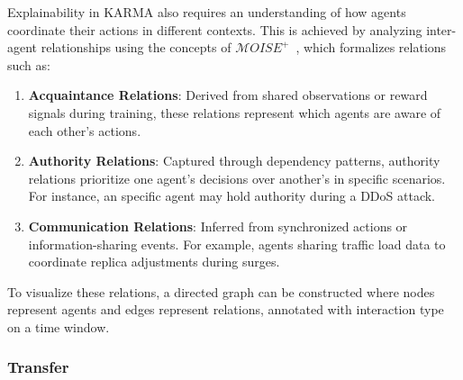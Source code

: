 Explainability in KARMA also requires an understanding of how agents coordinate their actions in different contexts. This is achieved by analyzing inter-agent relationships using the concepts of $\mathcal{M}OISE^+$~\cite{hubner2002moise}, which formalizes relations such as:
\begin{enumerate}[label=\textbf{\arabic*)}, itemjoin={;\quad }]
    \item \textbf{Acquaintance Relations}: Derived from shared observations or reward signals during training, these relations represent which agents are aware of each other's actions.
    \item \textbf{Authority Relations}: Captured through dependency patterns, authority relations prioritize one agent's decisions over another's in specific scenarios. For instance, an specific agent may hold authority during a DDoS attack.
    \item \textbf{Communication Relations}: Inferred from synchronized actions or information-sharing events. For example, agents sharing traffic load data to coordinate replica adjustments during surges.
\end{enumerate}

To visualize these relations, a directed graph can be constructed where nodes represent agents and edges represent relations, annotated with interaction type on a time window.




\subsubsection{Transfer}
\label{sec:transfer}


